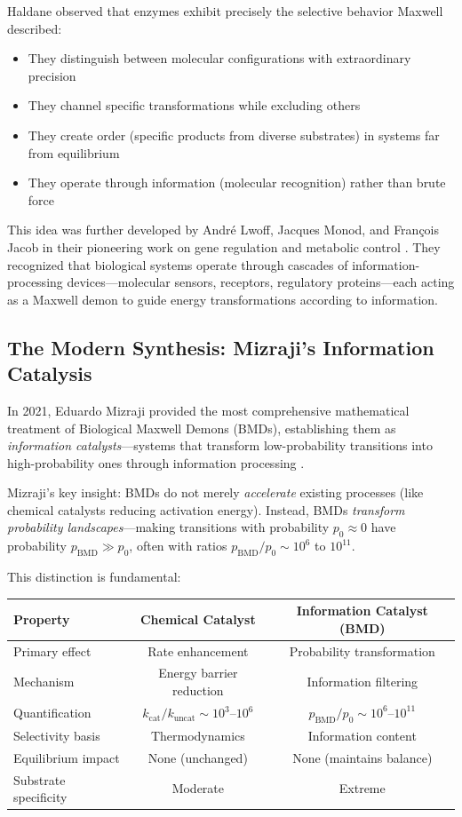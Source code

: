 \documentclass[12pt,a4paper]{article}
\begin{document}
Haldane observed that enzymes exhibit precisely the selective behavior Maxwell described:
\begin{itemize}
\item They distinguish between molecular configurations with extraordinary precision
\item They channel specific transformations while excluding others
\item They create order (specific products from diverse substrates) in systems far from equilibrium
\item They operate through information (molecular recognition) rather than brute force
\end{itemize}

This idea was further developed by André Lwoff, Jacques Monod, and François Jacob in their pioneering work on gene regulation and metabolic control \cite{monod1971chance,jacob1970logic}. They recognized that biological systems operate through cascades of information-processing devices—molecular sensors, receptors, regulatory proteins—each acting as a Maxwell demon to guide energy transformations according to information.

\subsection{The Modern Synthesis: Mizraji's Information Catalysis}

In 2021, Eduardo Mizraji provided the most comprehensive mathematical treatment of Biological Maxwell Demons (BMDs), establishing them as \textit{information catalysts}—systems that transform low-probability transitions into high-probability ones through information processing \cite{mizraji2021biological}.

Mizraji's key insight: BMDs do not merely \textit{accelerate} existing processes (like chemical catalysts reducing activation energy). Instead, BMDs \textit{transform probability landscapes}—making transitions with probability $p_0 \approx 0$ have probability $p_{\text{BMD}} \gg p_0$, often with ratios $p_{\text{BMD}}/p_0 \sim 10^6$ to $10^{11}$.

This distinction is fundamental:

\begin{center}
\begin{tabular}{lcc}
\toprule
\textbf{Property} & \textbf{Chemical Catalyst} & \textbf{Information Catalyst (BMD)} \\
\midrule
Primary effect & Rate enhancement & Probability transformation \\
Mechanism & Energy barrier reduction & Information filtering \\
Quantification & $k_{\text{cat}}/k_{\text{uncat}} \sim 10^3$--$10^6$ & $p_{\text{BMD}}/p_0 \sim 10^6$--$10^{11}$ \\
Selectivity basis & Thermodynamics & Information content \\
Equilibrium impact & None (unchanged) & None (maintains balance) \\
Substrate specificity & Moderate & Extreme \\
\bottomrule
\end{tabular}
\end{center}
\end{document}
